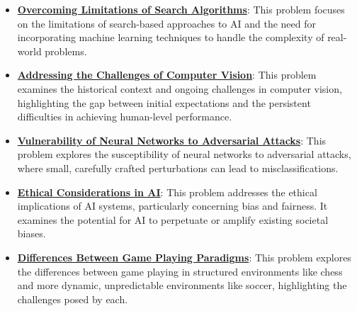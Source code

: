 \documentclass{article}%
\begin{document}
\begin{itemize}[leftmargin=*]
\item \href{https://purdue.brightspace.com/d2l/common/assets/pdfjs-d2l-dist/1.0.14-legacy/web/viewer.html?file=\%2Fcontent\%2Fenforced\%2F1095467-wl.202510.CS.24300.001\%2F02L2-Intro.pdf\%3Fou\%3D1095467\&lang=en-us\&container=d2l-fileviewer-rendered-pdf\&fullscreen=d2l-fileviewer-rendered-pdf-dialog\&height=667#page=12}{\textbf{Overcoming Limitations of Search Algorithms}}: This problem focuses on the limitations of search-based approaches to AI and the need for incorporating machine learning techniques to handle the complexity of real-world problems.%
\item \href{https://purdue.brightspace.com/d2l/common/assets/pdfjs-d2l-dist/1.0.14-legacy/web/viewer.html?file=\%2Fcontent\%2Fenforced\%2F1095467-wl.202510.CS.24300.001\%2F02L2-Intro.pdf\%3Fou\%3D1095467\&lang=en-us\&container=d2l-fileviewer-rendered-pdf\&fullscreen=d2l-fileviewer-rendered-pdf-dialog\&height=667#page=15}{\textbf{Addressing the Challenges of Computer Vision}}: This problem examines the historical context and ongoing challenges in computer vision, highlighting the gap between initial expectations and the persistent difficulties in achieving human-level performance.%
\item \href{https://purdue.brightspace.com/d2l/common/assets/pdfjs-d2l-dist/1.0.14-legacy/web/viewer.html?file=\%2Fcontent\%2Fenforced\%2F1095467-wl.202510.CS.24300.001\%2F02L2-Intro.pdf\%3Fou\%3D1095467\&lang=en-us\&container=d2l-fileviewer-rendered-pdf\&fullscreen=d2l-fileviewer-rendered-pdf-dialog\&height=667#page=19}{\textbf{Vulnerability of Neural Networks to Adversarial Attacks}}: This problem explores the susceptibility of neural networks to adversarial attacks, where small, carefully crafted perturbations can lead to misclassifications.%
\item \href{https://purdue.brightspace.com/d2l/common/assets/pdfjs-d2l-dist/1.0.14-legacy/web/viewer.html?file=\%2Fcontent\%2Fenforced\%2F1095467-wl.202510.CS.24300.001\%2F02L2-Intro.pdf\%3Fou\%3D1095467\&lang=en-us\&container=d2l-fileviewer-rendered-pdf\&fullscreen=d2l-fileviewer-rendered-pdf-dialog\&height=667#page=20}{\textbf{Ethical Considerations in AI}}: This problem addresses the ethical implications of AI systems, particularly concerning bias and fairness. It examines the potential for AI to perpetuate or amplify existing societal biases.%
\item \href{https://purdue.brightspace.com/d2l/common/assets/pdfjs-d2l-dist/1.0.14-legacy/web/viewer.html?file=\%2Fcontent\%2Fenforced\%2F1095467-wl.202510.CS.24300.001\%2F02L2-Intro.pdf\%3Fou\%3D1095467\&lang=en-us\&container=d2l-fileviewer-rendered-pdf\&fullscreen=d2l-fileviewer-rendered-pdf-dialog\&height=667#page=27}{\textbf{Differences Between Game Playing Paradigms}}: This problem explores the differences between game playing in structured environments like chess and more dynamic, unpredictable environments like soccer, highlighting the challenges posed by each.%

\end{itemize}
\end{document}
